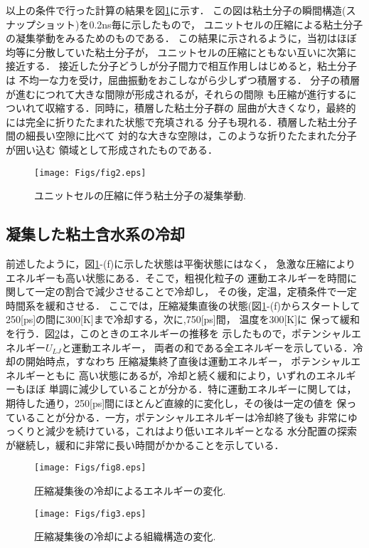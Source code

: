 以上の条件で行った計算の結果を図\ref{fig:fig2}に示す．
この図は粘土分子の瞬間構造(スナップショット)を0.2ns毎に示したもので，
ユニットセルの圧縮による粘土分子の凝集挙動をみるためのものである．
この結果に示されるように，当初はほぼ均等に分散していた粘土分子が，
ユニットセルの圧縮にともない互いに次第に接近する．
接近した分子どうしが分子間力で相互作用しはじめると，粘土分子は
不均一な力を受け，屈曲振動をおこしながら少しずつ積層する．
分子の積層が進むにつれて大きな間隙が形成されるが，それらの間隙
も圧縮が進行するについれて収縮する．同時に，積層した粘土分子群の
屈曲が大きくなり，最終的には完全に折りたたまれた状態で充填される
分子も現れる．積層した粘土分子間の細長い空隙に比べて
対的な大きな空隙は，このような折りたたまれた分子が囲い込む
領域として形成されたものである．
\begin{figure}[h]
	\begin{center}
	\texttt{[image: Figs/fig2.eps]} 
	\end{center}
	\caption{
		ユニットセルの圧縮に伴う粘土分子の凝集挙動.
	} 
	\label{fig:fig2}
\end{figure}
\subsection{凝集した粘土含水系の冷却}
前述したように，図\ref{fig:fig2}-(f)に示した状態は平衡状態にはなく，
急激な圧縮によりエネルギーも高い状態にある．そこで，粗視化粒子の
運動エネルギーを時間に関して一定の割合で減少させることで冷却し，
その後，定温，定積条件で一定時間系を緩和させる．
ここでは，圧縮凝集直後の状態(図\ref{fig:fig2}-(f)からスタートして
250[ps]の間に300[K]まで冷却する，次に,750[ps]間， 温度を300[K]に
保って緩和を行う．図\ref{fig:fig8}は，このときのエネルギーの推移を
示したもので，ポテンシャルエネルギー$U_{LJ}$と運動エネルギー，
両者の和である全エネルギーを示している．冷却の開始時点，すなわち
圧縮凝集終了直後は運動エネルギー， ポテンシャルエネルギーともに
高い状態にあるが，冷却と続く緩和により，いずれのエネルギーもほぼ
単調に減少していることが分かる．特に運動エネルギーに関しては，
期待した通り，250[ps]間にほとんど直線的に変化し，その後は一定の値を
保っていることが分かる．一方，ポテンシャルエネルギーは冷却終了後も
非常にゆっくりと減少を続けている，これはより低いエネルギーとなる
水分配置の探索が継続し，緩和に非常に長い時間がかかることを示している．
\begin{figure}[h]
	\begin{center}
	\texttt{[image: Figs/fig8.eps]} 
	\end{center}
	\caption{
		圧縮凝集後の冷却によるエネルギーの変化.
	} 
	\label{fig:fig8}
\end{figure}
\begin{figure}[h]
	\begin{center}
	\texttt{[image: Figs/fig3.eps]} 
	\end{center}
	\caption{
		圧縮凝集後の冷却による組織構造の変化.
	} 
	\label{fig:fig3}
\end{figure}

